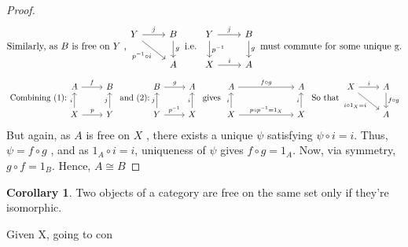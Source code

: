 \documentclass{article}
\theoremstyle{definition}
\theoremstyle{definition}
\newtheorem{corollary}{Corollary}[theorem]
\begin{document}
\begin{proof}
	\begin{equation}
		\text{Similarly, as $ B$  is free on $ Y $ ,}
		\begin{tikzcd}
			Y \arrow{r}{j} \arrow[swap]{dr}{p^{-1} \circ i} & B  \arrow{d}{g} \\ & A
		\end{tikzcd}
		\text{ i.e. }
		\begin{tikzcd}
			Y \arrow{r}{j} \arrow{d}{p^{-1}} & B  \arrow{d}{g} \\ X \arrow{r}{i} & A
		\end{tikzcd}
		\text{ must commute for some unique g.}
	\end{equation}
	\begin{equation*}
		\text{ Combining (1):}
		\begin{tikzcd}
			A \arrow{r}{f} & B \\ X \arrow{u}{i} \arrow{r}{p} & Y\arrow{u}{j}
		\end{tikzcd}
		\text{ and (2):}
		\begin{tikzcd}
			B \arrow{r}{g} & A \\ Y \arrow{u}{j} \arrow{r}{p^{-1}} & X\arrow{u}{i}
		\end{tikzcd}
		\text{ gives }
		\begin{tikzcd}
			A \arrow{r}{f \circ g} &[4em] A \\ X \arrow{u}{i} \arrow{r}{p \circ p^{-1} = 1_X} & X\arrow{u}{i}
		\end{tikzcd}
		\text{ So that }
		\begin{tikzcd}
			X \arrow{r}{i} \arrow[swap]{dr}{i \circ 1_X = i} &A \arrow{d}{f \circ g} \\ &A
		\end{tikzcd}
	\end{equation*}
	But again, as $ A $ is free on $ X $ , there exists a unique $ \psi $ satisfying $ \psi \circ i = i $. Thus, $ \psi = f \circ g $ , and as $ 1_A \circ i = i $, uniqueness of $ \psi $ gives $ f \circ g = 1_A $. Now, via symmetry, $ g \circ f = 1_B $. Hence, $A \cong B$
\end{proof}
\begin{corollary}
	Two objects of a category are free on the same set only if they're isomorphic.
\end{corollary}

Given X, going to con
\end{document}
